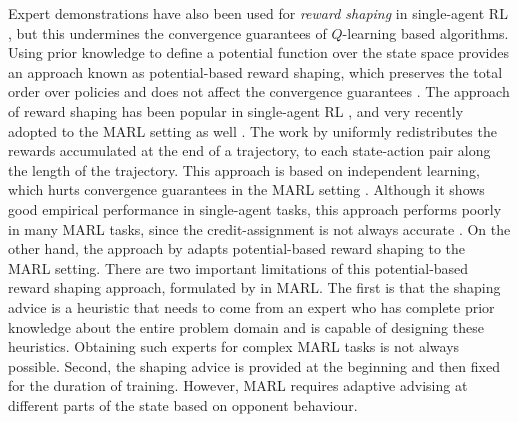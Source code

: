 \documentclass[jair, twoside,11pt,theapa]{article}
\begin{document}
Expert demonstrations have also been used for \textit{reward shaping} in single-agent RL \citep{laud2004theory}, but this undermines the convergence guarantees of $Q$-learning based algorithms. Using prior knowledge to define a potential function over the state space provides an approach known as potential-based reward shaping, which preserves the total order over policies and does not affect the convergence guarantees \citep{ng1999policy, wiewiora2003principled}. The approach of reward shaping has been popular in single-agent RL \citep{ofir2018belief}, and very recently adopted to the MARL setting as well \citep{devlin2011empirical, tanmay2020learning, baicen2021shaping}. The work by \cite{tanmay2020learning} uniformly redistributes the rewards  accumulated at the end of a trajectory, to each state-action pair along the length of the trajectory. This approach is based on independent learning, which hurts convergence guarantees in the MARL setting \citep{tan1997multi}. Although it shows good empirical performance in single-agent tasks, this approach performs poorly in many MARL tasks, since the credit-assignment is not always accurate \citep{baicen2021shaping}. On the other hand, the approach by \cite{baicen2021shaping} adapts potential-based reward shaping to the MARL setting. There are two important limitations of this potential-based reward shaping approach, formulated by \cite{baicen2021shaping} in MARL. The first is that the shaping advice is a heuristic that needs to come from an expert who has complete prior knowledge about the entire problem domain and is capable of designing these heuristics. Obtaining such experts for complex MARL tasks is not always possible. Second, the shaping advice is provided at the beginning and then fixed for the duration of training. However, MARL requires adaptive advising at different parts of the state based on opponent behaviour. 
\end{document}
